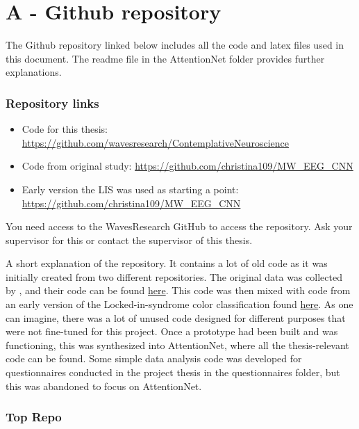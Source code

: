 

\chapter{A - Github repository}
\label{Appendix A}

The Github repository linked below includes all the code and latex files used in this document. The readme file in the AttentionNet folder provides further explanations. 


\subsection*{Repository links}
\begin{itemize}
    \item Code for this thesis: \url{https://github.com/wavesresearch/ContemplativeNeuroscience} 
    \item Code from original study: \url{https://github.com/christina109/MW_EEG_CNN}
    \item Early version the LIS was used as starting a point: \url{https://github.com/christina109/MW_EEG_CNN}
\end{itemize}

You need access to the WavesResearch GitHub to access the repository. Ask your supervisor for this or contact the supervisor of this thesis.

A short explanation of the repository. It contains a lot of old code as it was initially created from two different repositories. The original data was collected by \cite{Jin2019PredictingMW}, and their code can be found \href{https://github.com/christina109/MW_EEG_CNN}{here}. This code was then mixed with code from an early version of the Locked-in-syndrome color classification found \href{https://github.com/wavesresearch/EEG-LIS-Project_Fall2023/tree/main}{here}. As one can imagine, there was a lot of unused code designed for different purposes that were not fine-tuned for this project. Once a prototype had been built and was functioning, this was synthesized into AttentionNet, where all the thesis-relevant code can be found. Some simple data analysis code was developed for questionnaires conducted in the project thesis in the questionnaires folder, but this was abandoned to focus on AttentionNet.

\subsection*{Top Repo}

